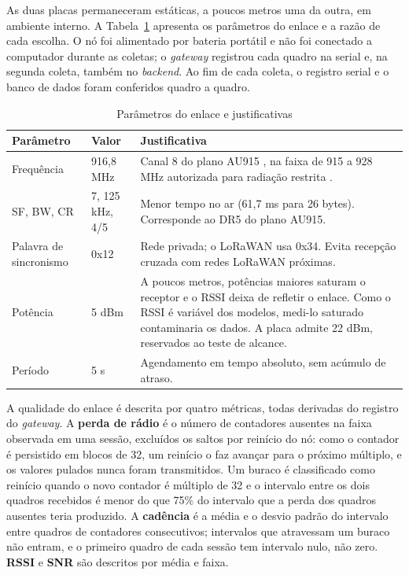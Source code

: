 As duas placas permaneceram estáticas, a poucos metros uma da outra, em ambiente interno. A Tabela~\ref{tab:parametros_enlace} apresenta os parâmetros do enlace e a razão de cada escolha. O nó foi alimentado por bateria portátil e não foi conectado a computador durante as coletas; o \textit{gateway} registrou cada quadro na serial e, na segunda coleta, também no \textit{backend}. Ao fim de cada coleta, o registro serial e o banco de dados foram conferidos quadro a quadro.

\begin{table}[htb]
\centering
\caption{Parâmetros do enlace e justificativas}
\label{tab:parametros_enlace}
\small
\begin{tabular}{p{3cm}p{2cm}p{}}
\hline
\textbf{Parâmetro} & \textbf{Valor} & \textbf{Justificativa} \\
\hline
Frequência & 916,8 MHz & Canal 8 do plano AU915 \cite{lorawan_rp002}, na faixa de 915 a 928 MHz autorizada para radiação restrita \cite{anatel_radiacao_restrita}. \\
SF, BW, CR & 7, 125 kHz, 4/5 & Menor tempo no ar (61,7 ms para 26 bytes). Corresponde ao DR5 do plano AU915. \\
Palavra de sincronismo & 0x12 & Rede privada; o LoRaWAN usa 0x34. Evita recepção cruzada com redes LoRaWAN próximas. \\
Potência & 5 dBm & A poucos metros, potências maiores saturam o receptor e o RSSI deixa de refletir o enlace. Como o RSSI é variável dos modelos, medi-lo saturado contaminaria os dados. A placa admite 22 dBm, reservados ao teste de alcance. \\
Período & 5 s & Agendamento em tempo absoluto, sem acúmulo de atraso. \\
\hline
\end{tabular}
\end{table}

A qualidade do enlace é descrita por quatro métricas, todas derivadas do registro do \textit{gateway}. A \textbf{perda de rádio} é o número de contadores ausentes na faixa observada em uma sessão, excluídos os saltos por reinício do nó: como o contador é persistido em blocos de 32, um reinício o faz avançar para o próximo múltiplo, e os valores pulados nunca foram transmitidos. Um buraco é classificado como reinício quando o novo contador é múltiplo de 32 e o intervalo entre os dois quadros recebidos é menor do que 75\% do intervalo que a perda dos quadros ausentes teria produzido. A \textbf{cadência} é a média e o desvio padrão do intervalo entre quadros de contadores consecutivos; intervalos que atravessam um buraco não entram, e o primeiro quadro de cada sessão tem intervalo nulo, não zero. \textbf{RSSI} e \textbf{SNR} são descritos por média e faixa.

